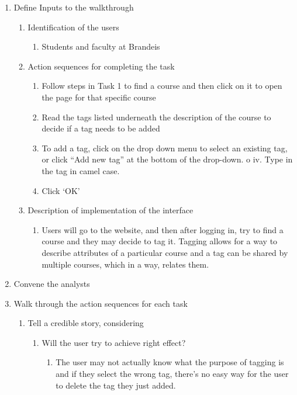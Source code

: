 \documentclass[12pt]{report}
\begin{document}
\begin{enumerate}
\item Define Inputs to the walkthrough
	\begin{enumerate}
    \item Identification of the users
    	\begin{enumerate}
        \item Students and faculty at Brandeis 
        \end{enumerate}
    \item Action sequences for completing the task
    	\begin{enumerate}
        \item Follow steps in Task 1 to find a course and then click on it to open the page for that specific course
        \item Read the tags listed underneath the description of the course to decide if a tag needs to be added
        \item To add a tag, click on the drop down menu to select an existing tag, or click “Add new tag” at the bottom of the drop-down. o iv. Type in the tag in camel case.
        \item Click ‘OK’
        \end{enumerate}
    \item Description of implementation of the interface
    	\begin{enumerate}
        \item Users will go to the website, and then after logging in, try to find a course and they may decide to tag it. Tagging allows for a way to describe attributes of a particular course and a tag can be shared by multiple courses, which in a way, relates them.
        \end{enumerate}
    \end{enumerate}
\item Convene the analysts
\item Walk through the action sequences for each task
	\begin{enumerate}
    \item Tell a credible story, considering
    	\begin{enumerate}
        \item Will the user try to achieve right effect?
        	\begin{enumerate}
            \item The user may not actually know what the purpose of tagging is and if they select the wrong tag, there’s no easy way for the user to delete the tag they just added. 

\end{enumerate}
\end{enumerate}
\end{enumerate}
\end{enumerate}
\end{document}
